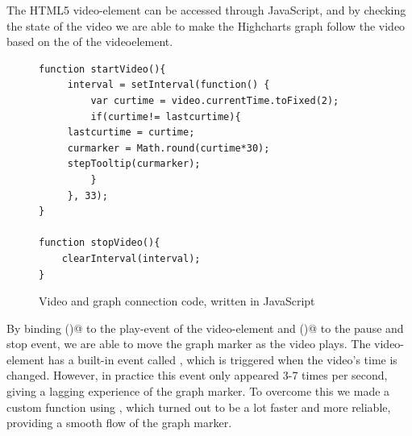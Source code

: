 The HTML5 video-element can be accessed through JavaScript, and by checking the state of the video we are able to make the Highcharts graph follow the video based on the \verb@currentTime@ of the videoelement.

\begin{figure}
	\begin{lstlisting}[style=htmlcssjs]
function startVideo(){
	 interval = setInterval(function() {
		 var curtime = video.currentTime.toFixed(2);
		 if(curtime!= lastcurtime){
	 lastcurtime = curtime;
	 curmarker = Math.round(curtime*30);
	 stepTooltip(curmarker);
		 }
	 }, 33);
}

function stopVideo(){
	clearInterval(interval);
}
	\end{lstlisting}
	\caption{Video and graph connection code, written in JavaScript}
	\label{fig:videocode}
\end{figure}

By binding \verb@startVideo()@ to the play-event of the video-element and \verb@stopVideo()@ to the pause and stop event, we are able to move the graph marker as the video plays. The video-element has a built-in event called \verb@timeupdate@, which is triggered when the video's time is changed. However, in practice this event only appeared 3-7 times per second, giving a lagging experience of the graph marker. To overcome this we made a custom function using \verb@setInterval@, which turned out to be a lot faster and more reliable, providing a smooth flow of the graph marker. 


